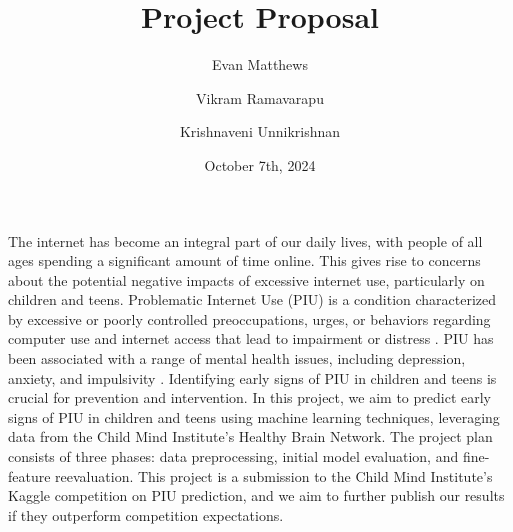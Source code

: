 \documentclass[11pt]{extarticle}
\title{Project Proposal}
\author[1]{Evan Matthews}
\author[1]{Vikram Ramavarapu}
\author[1]{Krishnaveni Unnikrishnan}
\affil[1]{CS 412 Group 6}
\date{October 7th, 2024}
\begin{document}
\maketitle

\pagebreak





The internet has become an integral part of our daily lives, with people of all ages spending a significant amount of time online. This gives rise to concerns about the potential negative impacts of excessive internet use, particularly on children and teens.
Problematic Internet Use (PIU) is a condition characterized by excessive or poorly controlled preoccupations, urges, or behaviors regarding computer use and internet access that lead to impairment or distress \cite{Pettorruso2020-qt}. 
PIU has been associated with a range of mental health issues, including depression, anxiety, and impulsivity \cite{Cash2012-rb}.
Identifying early signs of PIU in children and teens is crucial for prevention and intervention.
In this project, we aim to predict early signs of PIU in children and teens using machine learning techniques, leveraging data from the Child Mind Institute's Healthy Brain Network.
The project plan consists of three phases: data preprocessing, initial model evaluation, and fine-feature reevaluation.
This project is a submission to the Child Mind Institute's Kaggle competition on PIU prediction, and we aim to further publish our results if they outperform competition expectations.

\end{document}
